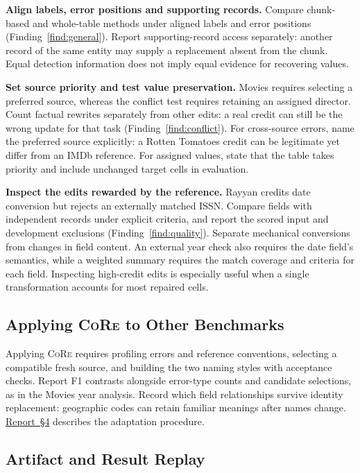 \documentclass[sigconf, nonacm]{acmart}
\newcommand{\core}{\textsc{CoRe}}
\newcommand{\companionref}[1]{\href{https://github.com/hinsonver/CoRe-Benchmark/raw/refs/heads/main/paper/CoRe-Supplementary-Technical-Report.pdf\#nameddest=companion-#1}{Report~\S#1}}
\begin{document}
\textbf{Align labels, error positions and supporting records.} Compare chunk-based and
whole-table methods under aligned labels and error positions (Finding~\ref{find:general}).
Report supporting-record access separately: another record of the same entity may supply a
replacement absent from the chunk. Equal detection information does not imply equal evidence
for recovering values.

\textbf{Set source priority and test value preservation.} Movies requires selecting a preferred
source, whereas the conflict test requires retaining an assigned director. Count factual rewrites
separately from other edits: a real credit can still be the wrong update for that task
(Finding~\ref{find:conflict}). For cross-source errors, name the preferred source explicitly:
a Rotten Tomatoes credit can be legitimate yet differ from an IMDb reference. For assigned
values, state that the table takes priority and include unchanged target cells in evaluation.

\textbf{Inspect the edits rewarded by the reference.} Rayyan credits date conversion but rejects an
externally matched ISSN. Compare fields with independent records under explicit criteria, and
report the scored input and development exclusions (Finding~\ref{find:quality}). Separate
mechanical conversions from changes in field content. An external year check also requires
the date field's semantics, while a weighted summary requires the match coverage and criteria
for each field. Inspecting high-credit edits is especially useful when a single transformation
accounts for most repaired cells.

\subsection{Applying \core{} to Other Benchmarks}\label{sec:apply}

Applying \core{} requires profiling errors and reference conventions, selecting a compatible
fresh source, and building the two naming styles with acceptance checks. Report F1 contrasts
alongside error-type counts and candidate selections, as in the Movies year
analysis. Record which field relationships survive identity replacement: geographic
codes can retain familiar meanings after names change. \companionref{4} describes the
adaptation procedure.

\subsection{Artifact and Result Replay}\label{sec:artifact}
\end{document}
